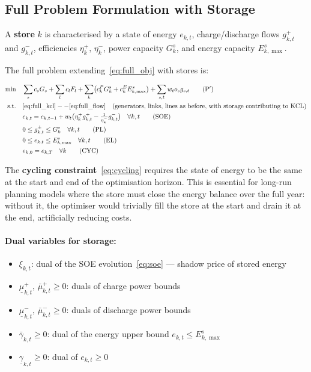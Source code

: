 \documentclass{article}
\begin{document}
\subsection{Full Problem Formulation with Storage}

A \textbf{store} $k$ is characterised by a state of energy $e_{k,t}$,
charge/discharge flows $g^+_{k,t}$ and $g^-_{k,t}$, efficiencies
$\eta^+_k,\, \eta^-_k$, power capacity $G^s_k$, and energy capacity
$E^s_{k,\max}$.

The full problem extending~\eqref{eq:full_obj} with stores is:

\begin{align}
\min \quad
    & \sum_{s} c_s G_s + \sum_{l} c_l F_l
      + \sum_{k} \bigl(c^P_k G^s_k + c^E_k E^s_{k,\max}\bigr)
      + \sum_{s,t} w_t o_s g_{s,t}
      \tag{P$'$} \label{eq:full_obj_store} \\
\text{s.t.} \quad
    & \eqref{eq:full_kcl}--\eqref{eq:full_flow}
    \quad \text{(generators, links, lines as before, with storage contributing to KCL)} \notag \\
    & e_{k,t} = e_{k,t-1} + w_t \bigl(\eta^+_k g^+_{k,t}
      - \tfrac{1}{\eta^-_k} g^-_{k,t}\bigr)
      \quad \forall k,t
      \tag{SOE} \label{eq:soe} \\
    & 0 \le g^\pm_{k,t} \le G^s_k
      \quad \forall k,t
      \tag{PL} \label{eq:power_lim} \\
    & 0 \le e_{k,t} \le E^s_{k,\max}
      \quad \forall k,t
      \tag{EL} \label{eq:energy_lim} \\
    & e_{k,0} = e_{k,T}
      \quad \forall k
      \tag{CYC} \label{eq:cycling}
\end{align}

The \textbf{cycling constraint}~\eqref{eq:cycling} requires the state of
energy to be the same at the start and end of the optimisation horizon.
This is essential for long-run planning models where the store must close the
energy balance over the full year: without it, the optimiser would trivially
fill the store at the start and drain it at the end, artificially reducing costs.

\paragraph{Dual variables for storage:}
\begin{itemize}
    \item $\xi_{k,t}$: dual of the SOE evolution~\eqref{eq:soe} ---
          shadow price of stored energy
    \item $\underline{\mu}^+_{k,t},\, \bar{\mu}^+_{k,t} \ge 0$:
          duals of charge power bounds
    \item $\underline{\mu}^-_{k,t},\, \bar{\mu}^-_{k,t} \ge 0$:
          duals of discharge power bounds
    \item $\bar{\gamma}_{k,t} \ge 0$: dual of the energy upper bound
          $e_{k,t} \le E^s_{k,\max}$
    \item $\underline{\gamma}_{k,t} \ge 0$: dual of $e_{k,t} \ge 0$
\end{itemize}
\end{document}
